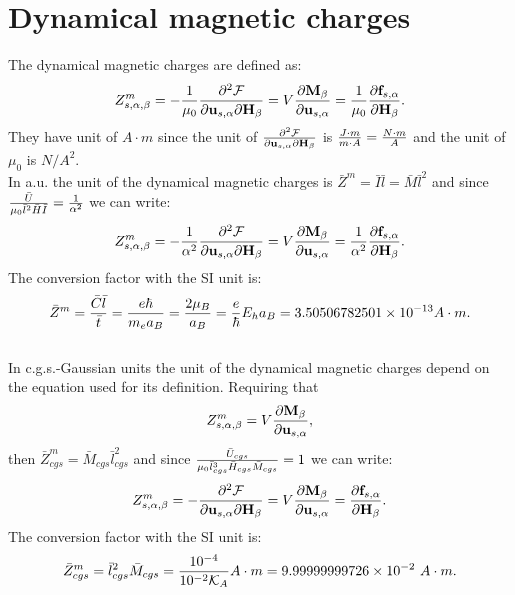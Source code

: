\documentclass[12pt,a4paper]{article}
\def\bardmc{3.50506782501\times 10^{-13}}
\def\zmtozm{9.99999999726\times 10^{-2}}
\begin{document}
\section{\color{coral}Dynamical magnetic charges}
The dynamical magnetic charges are defined as:
\begin{equation}
Z^m_{s,\alpha,\beta}= -{1\over \mu_0} {\partial^2 \mathcal{F} \over \partial 
{\bf u}_{s,\alpha} \partial {\bf H}_{\beta}}=V {\partial {\bf M}_{\beta}
\over \partial {\bf u}_{s,\alpha}}= {1\over \mu_0}{\partial {\bf f}_{s,\alpha} 
\over \partial {\bf H}_{\beta}}. 
\end{equation}
They have unit of $A\cdot m$ since the unit of 
${\partial^2 \mathcal{F} \over \partial 
{\bf u}_{s,\alpha} \partial {\bf H}_{\beta}}$ is ${J \cdot m \over m\cdot A}=
{N\cdot m \over A}$ and the unit of $\mu_0$ is $N/A^2$.
\\

{\color{web-blue} In a.u. the unit of the dynamical magnetic charges is
$\bar Z^m = \bar I \bar l = \bar M \bar l^2$ and since 
${\bar U \over \mu_0 \bar l^2 \bar H \bar I}={1\over \alpha^2}$ we can write:
\begin{equation}
Z^m_{s,\alpha,\beta}=-{1\over \alpha^2} {\partial^2 \mathcal{F} \over \partial 
{\bf u}_{s,\alpha} \partial {\bf H}_{\beta}}=
V {\partial {\bf M}_{\beta} \over \partial {\bf u}_{s,\alpha}}=
{1\over \alpha^2}{\partial {\bf f}_{s,\alpha} \over \partial {\bf H}_{\beta}}.
\end{equation}
The conversion factor with the SI unit is:
\begin{equation}
\bar Z^m = {\bar C \bar l \over \bar t} = {e \hbar \over m_e a_B}={2 \mu_B \over a_B} = {e \over \hbar} E_h a_B=\bardmc A\cdot m.
\end{equation}
}
\\

{\color{orange} In c.g.s.-Gaussian units the unit of the dynamical magnetic 
charges depend on the equation used for its definition.
Requiring that
\begin{equation}
Z^m_{s,\alpha,\beta}= V 
{\partial {\bf M}_{\beta} \over \partial {\bf u}_{s,\alpha}},
\end{equation}
then $\bar Z^m_{cgs} = \bar M_{cgs} \bar l_{cgs}^2$ 
and since 
${\bar U_{cgs} \over \mu_0 \bar l_{cgs}^3 \bar H_{cgs} \bar M_{cgs}}=1
$ we can write:
\begin{equation}
Z^m_{s,\alpha,\beta}=-{\partial^2 \mathcal{F} \over \partial 
{\bf u}_{s,\alpha} \partial {\bf H}_{\beta}}= V 
{\partial {\bf M}_{\beta} \over \partial {\bf u}_{s,\alpha}}=
{\partial {\bf f}_{s,\alpha} \over \partial {\bf H}_{\beta}}.
\end{equation}
The conversion factor with the SI unit is:
\begin{equation}
\bar Z^m_{cgs} = \bar l^2_{cgs} \bar M_{cgs}={10^{-4} \over 10^{-2} 
\mathcal{K}_A}
A\cdot m=\zmtozm\ A\cdot m.
\end{equation}
}
\end{document}
